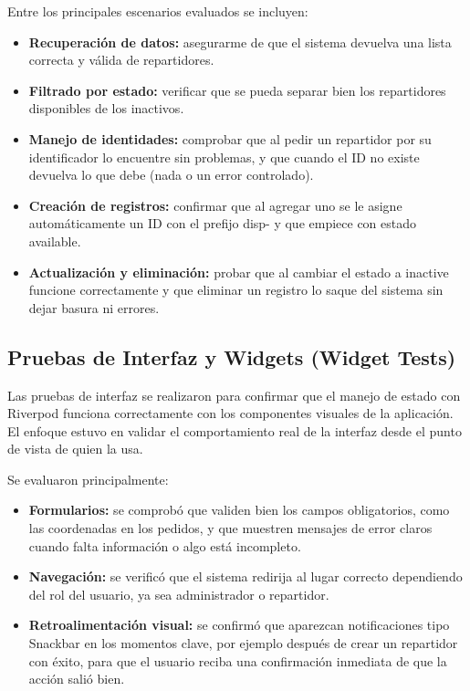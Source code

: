 Entre los principales escenarios evaluados se incluyen:
\begin{itemize}
    \item \textbf{Recuperación de datos:} asegurarme de que el sistema devuelva una lista correcta y válida de repartidores.
    \item \textbf{Filtrado por estado:} verificar que se pueda separar bien los repartidores disponibles de los inactivos.
    \item \textbf{Manejo de identidades:} comprobar que al pedir un repartidor por su identificador lo encuentre sin problemas, y que cuando el ID no existe devuelva lo que debe (nada o un error controlado).
    \item \textbf{Creación de registros:} confirmar que al agregar uno se le asigne automáticamente un ID con el prefijo disp- y que empiece con estado available.
    \item \textbf{Actualización y eliminación:} probar que al cambiar el estado a inactive funcione correctamente y que eliminar un registro lo saque del sistema sin dejar basura ni errores.
\end{itemize}

\subsection{Pruebas de Interfaz y Widgets (Widget Tests)}
Las pruebas de interfaz se realizaron para confirmar que el manejo de estado con Riverpod funciona correctamente con los componentes visuales de la aplicación. El enfoque estuvo en validar el comportamiento real de la interfaz desde el punto de vista de quien la usa.

Se evaluaron principalmente:
\begin{itemize}
    \item \textbf{Formularios:} se comprobó que validen bien los campos obligatorios, como las coordenadas en los pedidos, y que muestren mensajes de error claros cuando falta información o algo está incompleto.
    \item \textbf{Navegación:} se verificó que el sistema redirija al lugar correcto dependiendo del rol del usuario, ya sea administrador o repartidor.
    \item \textbf{Retroalimentación visual:} se confirmó que aparezcan notificaciones tipo Snackbar en los momentos clave, por ejemplo después de crear un repartidor con éxito, para que el usuario reciba una confirmación inmediata de que la acción salió bien.
\end{itemize}

